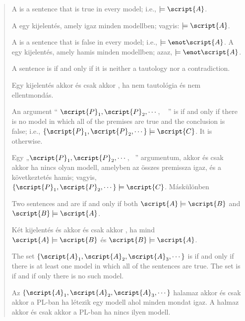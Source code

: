 \begin{quote}
A  is a sentence  that is true in every model; i.e.,  $\models\script{A}$.

A  egy  kijelentés, amely igaz minden modellben; vagyis:  $\models\script{A}$.

A  is a sentence  that is false in every model; i.e., $\models\enot\script{A}$.
A  egy  kijelentés, amely hamis minden modellben; azaz, $\models\enot\script{A}$.

A sentence is  if and only if it is neither a tautology nor a contradiction.

Egy kijelentés akkor és csak akkor , ha nem tautológia és nem ellentmondás.

An argument `` $\script{P}_1, \script{P}_2, \cdots$, \therefore\  '' is  if and only if there is no model in which all of the premises are true and the conclusion is false; i.e., $\{\script{P}_1,\script{P}_2,\cdots\}\models\script{C}$. It is  otherwise.

Egy „$\script{P}_1, \script{P}_2, \cdots$, \therefore\ ” argumentum, akkor és csak akkor  ha nincs olyan modell, amelyben az összes premissza igaz, és a következtetés hamis; vagyis,  $\{\script{P}_1,\script{P}_2,\cdots\}\models\script{C}$. Máskülönben 

Two sentences  and  are  if and only if both $\script{A}\models\script{B}$ and $\script{B}\models\script{A}$.

Két kijelentés   és  akkor és csak akkor , ha mind  $\script{A}\models\script{B}$ és $\script{B}\models\script{A}$.



The set $\{\script{A}_1,\script{A}_2,\script{A}_3,\cdots\}$ is  if and only if there is at least one model in which all of the sentences are true. The set is  if and if only there is no such model.

Az $\{\script{A}_1,\script{A}_2,\script{A}_3,\cdots\}$ halamaz akkor és csak akkor  a PL-ban ha létezik egy modell ahol minden mondat igaz. A halmaz akkor és csak akkor  a PL-ban ha nincs ilyen modell.

\end{quote}


